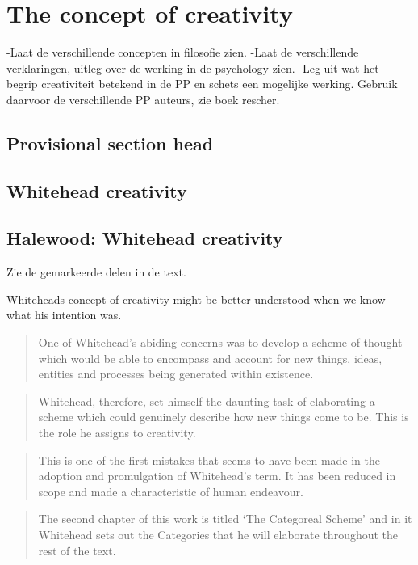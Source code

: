 \chapter{The concept of creativity}

-Laat de verschillende concepten in filosofie zien.
-Laat de verschillende verklaringen, uitleg over de werking in de psychology zien.
-Leg uit wat het begrip creativiteit betekend in de PP en schets een mogelijke werking. Gebruik daarvoor de verschillende PP auteurs, zie boek rescher.

\section{Provisional section head}
\section{Whitehead creativity}
\section{Halewood: Whitehead creativity}
Zie de gemarkeerde delen in de text.

Whiteheads concept of creativity might be better understood when we know what his intention was.
\begin{quotation}
	One of Whitehead’s abiding concerns was to
develop a scheme of thought which would be able to encompass and account for new
things, ideas, entities and processes being generated within existence.
\end{quotation}

\begin{quotation}
	Whitehead,
therefore, set himself the daunting task of elaborating a scheme which could genuinely
describe how new things come to be. This is the role he assigns to creativity.
\end{quotation}

\begin{quotation}
This is one of the first mistakes
that seems to have been made in the adoption and promulgation of Whitehead’s term.
It has been reduced in scope and made a characteristic of human endeavour.
\end{quotation}

\begin{quotation}
	The second chapter of this work is titled ‘The Categoreal
Scheme’ and in it Whitehead sets out the Categories that he will elaborate throughout
the rest of the text.
\end{quotation}

